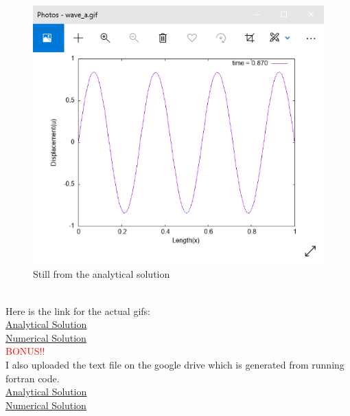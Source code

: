 \documentclass[oneside,hidelinks]{book}
\begin{document}
                        \pagebreak
                        \begin{figure}[hbtp]
                                \caption{Still from the analytical solution}
                                \hspace*{3cm}\includegraphics[scale=0.7]{wave_analytical.png}        
                        \end{figure}\\
                        Here is the link for the actual gifs:\\
                        \href{https://imgur.com/a/AoAPeOX}{\underline{Analytical Solution}}\\
                        \href{https://imgur.com/a/WHFYH6b}{\underline{Numerical Solution}}\\[5pt]

                        \textcolor{red}{BONUS!!}\\
                        I also uploaded the text file on the google drive which is generated from running fortran code.\\
                        \href{https://drive.google.com/file/d/1kXk8Ap_GSktrb_hs_hzjusJ-BBUGSaDM/view?usp=sharing}{\underline{Analytical Solution}}\\
                        \href{https://drive.google.com/file/d/1Afp1AZzLBLb2BL8miCo2TCGyx1rZjwZ7/view?usp=sharing}{\underline{Numerical Solution}}
\end{document}

